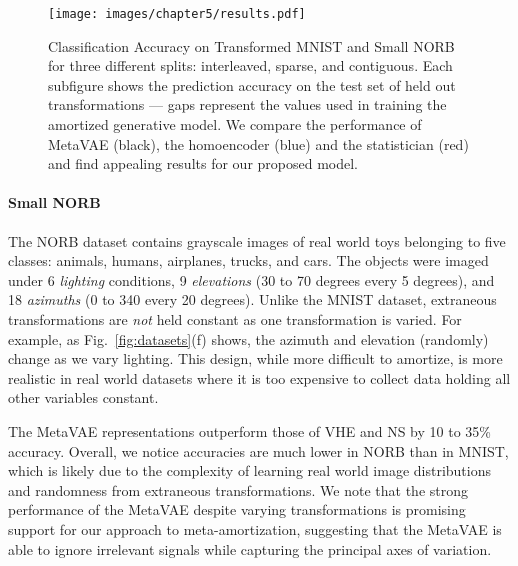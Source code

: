 \begin{figure}
    \centering
    \texttt{[image: images/chapter5/results.pdf]}
    \caption{Classification Accuracy on Transformed MNIST and Small NORB for three different splits: interleaved, sparse, and contiguous. Each subfigure shows the prediction accuracy on the test set of held out transformations --- gaps represent the values used in training the amortized generative model. We compare the performance of MetaVAE (black), the homoencoder (blue) and the statistician (red) and find appealing results for our proposed model.} 
    \label{fig:invariance:results}
\end{figure}

\paragraph{Small NORB}

The NORB dataset contains grayscale images of real world toys belonging to five classes: animals, humans, airplanes, trucks, and cars. The objects were imaged under 6 \textit{lighting} conditions, 9 \textit{elevations} (30 to 70 degrees every 5 degrees), and 18 \textit{azimuths} (0 to 340 every 20 degrees). Unlike the MNIST dataset, extraneous transformations are \textit{not} held constant as one transformation is varied. For example, as Fig.~\ref{fig:datasets}(f) shows, the azimuth and elevation (randomly) change as we vary lighting. This design, while more difficult to amortize, is more realistic in real world datasets where it is too expensive to collect data holding all other variables constant.

The MetaVAE representations outperform those of VHE and NS by 10 to 35\% accuracy. Overall, we notice accuracies are much lower in NORB than in MNIST, which is likely due to the complexity of learning real world image distributions and randomness from extraneous transformations. 
We note that the strong performance of the MetaVAE despite varying transformations is promising support for our approach to meta-amortization, suggesting that the MetaVAE is able to ignore irrelevant signals while capturing the principal axes of variation.

